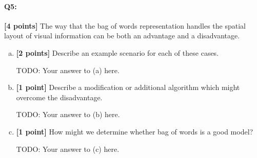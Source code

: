 






\pagebreak
\paragraph{Q5:} \textbf{[4 points]} The way that the bag of words representation handles the spatial layout of visual information can be both an advantage and a disadvantage.
\begin{enumerate}[(a)]
\item \textbf{[2 points]} Describe an example scenario for each of these cases.
\begin{mdframed}
TODO: Your answer to (a) here.
\end{mdframed}
\item \textbf{[1 point]} Describe a modification or additional algorithm which might\\overcome the disadvantage.
\begin{mdframed}
TODO: Your answer to (b) here.
\end{mdframed}

\item \textbf{[1 point]} How might we determine whether bag of words is a good model?
\begin{mdframed}
TODO: Your answer to (c) here.
\end{mdframed}
\end{enumerate}









